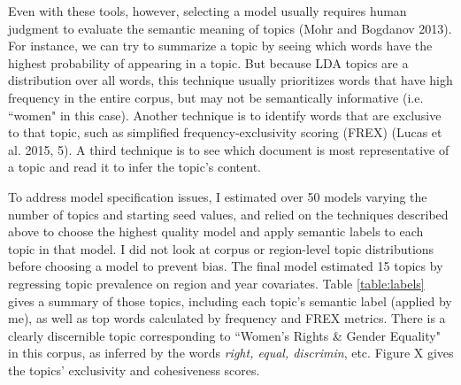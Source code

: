 \documentclass[11pt, oneside]{article}
\begin{document}
Even with these tools, however, selecting a model usually requires human judgment to evaluate the semantic meaning of topics (Mohr and Bogdanov 2013). For instance, we can try to summarize a topic by seeing which words have the highest probability of appearing in a topic. But because LDA topics are a distribution over all words, this technique usually prioritizes words that have high frequency in the entire corpus, but may not be semantically informative (i.e. ``women" in this case). Another technique is to identify words that are exclusive to that topic, such as simplified frequency-exclusivity scoring (FREX) (Lucas et al. 2015, 5). A third technique is to see which document is most representative of a topic and read it to infer the topic's content.

To address model specification issues, I estimated over 50 models varying the number of topics and starting seed values, and relied on the techniques described above to choose the highest quality model and apply semantic labels to each topic in that model. I did not look at corpus or region-level topic distributions before choosing a model to prevent bias. The final model estimated 15 topics by regressing topic prevalence on region and year covariates. Table \ref{table:labels} gives a summary of those topics, including each topic's semantic label (applied by me), as well as top words calculated by frequency and FREX metrics. There is a clearly discernible topic corresponding to ``Women's Rights \& Gender Equality" in this corpus, as inferred by the words \emph{right, equal, discrimin}, etc. Figure X gives the topics' exclusivity and cohesiveness scores.
\end{document}
